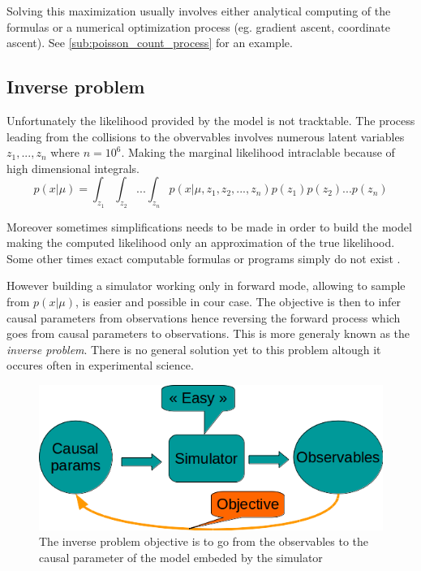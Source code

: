 Solving this maximization usually involves either analytical computing of the formulas or a numerical optimization process (eg. gradient ascent, coordinate ascent).
See \autoref{sub:poisson_count_process} for an example.








\subsection{Inverse problem} %
\label{sub:inverse_problem}


Unfortunately the likelihood provided by the model is not tracktable.
The process leading from the collisions to the obvervables involves numerous latent variables $z_1, ..., z_n$ where $n=10^6$.
Making the marginal likelihood intraclable because of high dimensional integrals.
\begin{equation}
	\label{eq:intractable_integral}
	p(x|\mu) = \int_{z_1} \int_{z_2} ... \int_{z_n} p(x|\mu, z_1, z_2, ..., z_n) p(z_1) p(z_2) ... p(z_n)
\end{equation}


Moreover sometimes simplifications needs to be made in order to build the model \needcite making the computed likelihood only an approximation of the true likelihood.
Some other times exact computable formulas or programs simply do not exist \needcite.



However building a simulator working only in forward mode, \ie allowing to sample from $p(x|\mu)$, is easier and possible in cour case.
The objective is then to infer causal parameters from observations hence reversing the forward process which goes from causal parameters to observations.
This is more generaly known as the \emph{inverse problem}.
There is no general solution yet to this problem altough it occures often in experimental science.


\begin{figure}[htb]
    \centering
    \includegraphics[width=0.8\linewidth]{inverse_problem}
    \caption{The inverse problem objective is to go from the observables to the causal parameter of the model embeded by the simulator}
    \label{fig:inverse_problem}
\end{figure}



